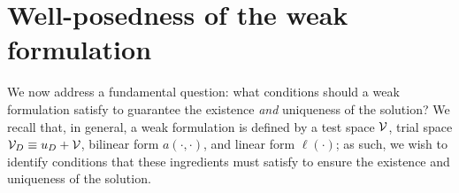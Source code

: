 
\section{Well-posedness of the weak formulation}
We now address a fundamental question: what conditions should a weak formulation satisfy to guarantee the existence \emph{and} uniqueness of the solution?  We recall that, in general, a weak formulation is defined by a test space $\mathcal{V}$, trial space $\mathcal{V}_D \equiv u_D + \mathcal{V}$, bilinear form $a(\cdot,\cdot)$, and linear form $\ell(\cdot)$; as such, we wish to identify conditions that these ingredients must satisfy to ensure the existence and uniqueness of the solution.

